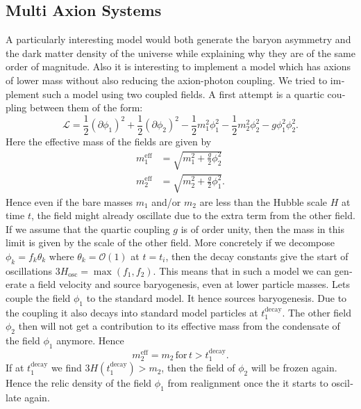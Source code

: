 \documentclass[master,       %
               twoside,        %
               BCOR10mm,       %
               english,ngerman, %
               ]{GAUBM}
\begin{document}
\begin{otherlanguage}{english}
\section{Multi Axion Systems}
A particularly interesting model would both generate the baryon asymmetry and the dark matter density of the universe while explaining why they are of the same order of magnitude.
Also it is interesting to implement a model which has axions of lower mass without also reducing the axion-photon coupling.
We tried to implement such a model using two coupled fields.
A first attempt is a quartic coupling between them of the form:
\begin{equation}
	\mathcal{L} = \frac{1}{2} (\partial \phi_1)^2 + \frac{1}{2} (\partial \phi_2)^2 - \frac{1}{2} m_1^2 \phi_1^2 - \frac{1}{2} m_2^2 \phi_2^2 - g \phi_1^2 \phi_2^2.
\end{equation}
Here the effective mass of the fields are given by
\begin{align}
	m_1^\mathrm{eff} &= \sqrt{m_1^2 + \frac{g}{2} \phi_2^2} \nonumber \\
	m_2^\mathrm{eff} &= \sqrt{m_2^2 + \frac{g}{2} \phi_1^2}.
\end{align}
Hence even if the bare masses $m_1$ and/or $m_2$ are less than the Hubble scale $H$ at time $t$, the field might already oscillate due to the extra term from the other field. If we assume that the quartic coupling $g$ is of order unity, then the mass in this limit is given by the scale of the other field.
More concretely if we decompose $\phi_k = f_k \theta_k$ where $\theta_k = \mathcal{O}(1)$ at $t = t_i$, then
the decay constants give the start of oscillations
$3 H_\mathrm{osc} = \max(f_1, f_2)$.
This means that in such a model we can generate a field velocity and source baryogenesis, even at lower particle masses. Lets couple the field $\phi_1$ to the standard model.
It hence sources baryogenesis. Due to the coupling it also decays into standard model particles at $t_1^\mathrm{decay}$.
The other field $\phi_2$ then will not get a contribution to its effective mass from the condensate of the field $\phi_1$ anymore. Hence
\begin{equation}
	m_2^\mathrm{eff} = m_2 \, \mathrm{for} \, t > t_1^\mathrm{decay}.
\end{equation}
If at $t_1^\mathrm{decay}$ we find $3 H(t_1^\mathrm{decay}) > m_2$, then the field of $\phi_2$ will be frozen again.
Hence the relic density of the field $\phi_1$ from realignment once the it starts to oscillate again.

\end{otherlanguage}
\end{document}
